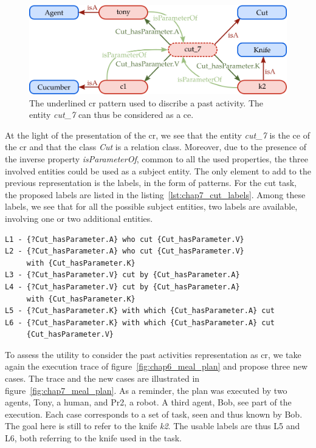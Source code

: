 \begin{figure}[ht!]
\centering
\includegraphics[scale=0.4]{figures/chapter7/cut7.png}
\caption{\label{fig:chap7_cut7} The underlined \acrlong{cr} pattern used to discribe a past activity. The entity \textit{cut\_7} can thus be considered as a \acrlong{ce}. }
\end{figure}

At the light of the presentation of the \acrshort{cr}, we see that the entity \textit{cut\_7} is the \acrlong{ce} of the \acrlong{cr} and that the class \textit{Cut} is a relation class. Moreover, due to the presence of the inverse property \textit{isParameterOf}, common to all the used properties, the three involved entities could be used as a subject entity. The only element to add to the previous representation is the labels, in the form of patterns. For the cut task, the proposed labels are listed in the listing~\ref{lst:chap7_cut_labels}. Among these labels, we see that for all the possible subject entities, two labels are available, involving one or two additional entities.

\begin{lstlisting}[frame=single, caption={ The set of labels usable to discribe the compound relation representing an instance of a cut primitive task.}, label={lst:chap7_cut_labels}, captionpos=b, style=Labels, mathescape=true]
L1 - {?Cut_hasParameter.A} who cut {Cut_hasParameter.V}
L2 - {?Cut_hasParameter.A} who cut {Cut_hasParameter.V} 
     with {Cut_hasParameter.K}
L3 - {?Cut_hasParameter.V} cut by {Cut_hasParameter.A}
L4 - {?Cut_hasParameter.V} cut by {Cut_hasParameter.A} 
     with {Cut_hasParameter.K}
L5 - {?Cut_hasParameter.K} with which {Cut_hasParameter.A} cut
L6 - {?Cut_hasParameter.K} with which {Cut_hasParameter.A} cut 
     {Cut_hasParameter.V}
\end{lstlisting}

To assess the utility to consider the past activities representation as \acrlong{cr}, we take again the execution trace of figure~\ref{fig:chap6_meal_plan} and propose three new cases. The trace and the new cases are illustrated in figure~\ref{fig:chap7_meal_plan}. As a reminder, the plan was executed by two agents, Tony, a human, and Pr2, a robot. A third agent, Bob, see part of the execution. Each case corresponds to a set of task, seen and thus known by Bob. The goal here is still to refer to the knife \textit{k2}. The usable labels are thus L5 and L6, both referring to the knife used in the task.

